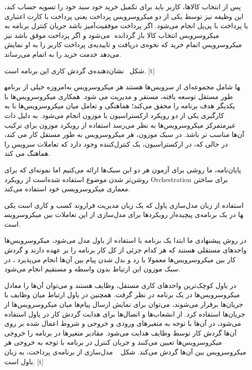 پس از انتخاب کالاها، کاربر باید برای تکمیل خرید خود سبد خود را تسویه حساب کند، این وظیفه نیز توسط یکی از دو میکروسرویس پرداخت یعنی پرداخت با کارت اعتباری یا پرداخت با پی‌پل انجام می‌شود. اگر پرداخت موفقیت‌آمیز باشد جریان کنترل برنامه به میکروسرویس انتخاب کالا باز گردانده ‌ می‌شود و اگر پرداخت موفق باشد نیز میکروسرویس اتمام خرید که نحوه‌ی دریافت و تاییدیه‌ی پرداخت کاربر را به او نمایش می‌دهد خدمت خرید را به اتمام می‌رساند.

شکل~ نشان‌دهنده‌ی گردش کاری این برنامه است.
[t]
\vspace{0.5em}



امروزه خیلی از برنامه‎ها شامل مجموعه‌ای از سرویس‌ها هستند هر میکروسرویس به طور مستقل توسعه یافته، مستقر و مدیریت می شود. 
همکاری میکروسرویس‌ها با یکدیگر هدف برنامه را محقق می‌کند؛ هماهنگی و تعامل میان میکروسرویس‌ها با به کارگیری یکی از دو رویکرد ارکستراسیون یا  موزون انجام می‌شود.
به دلیل ذات غیرمتمرکز میکروسرویس‌ها به نظر می‌رسد استفاده از رویکرد موزون برای ترکیب آن‌ها مناسب تر باشد. 
در سبک موزون، هر میکروسرویس به طور مستقل کار می کند، در حالی که، در ارکستراسیون، یک کنترل‌کننده وجود دارد که تعاملات سرویس را هماهنگ می کند. 

پایان‌نامه، ما روشی برای آزمون هر دو این سبک‌ها ارائه می‌کنیم اما نمونه‌ای که برای روشن‌تر شدن موضوع استفاده شده‌است از رویکرد Orchestration برای ساختن معماری میکروسرویسی خود استفاده می‌کند. 

استفاده از زبان‌ مدل‌سازی یاول که یک زبان مدیریت فراروند کسب و کاری است یکی از رویکردها برای مدل‌سازی از این تعاملات بین میکروسرویس‎ها در یک برنامه‌ی پیچیده است.

در روش پیشنهادی ما ابتدا یک برنامه با استفاده از یاول مدل می‌شود، میکروسرویس‌ها واحد‌های مستقلی هستند که هر کدام جزئی از کل کار برنامه را بر عهده دارند و گردش کار بین میکروسرویس‌ها معمولا با رد و بدل شدن پیام بین آن‌ها انجام می‌پذیرد ،
 در سبک موزون این ارتباط بدون واسطه و مستقیم انجام می‌شود. 
 
 در یاول کوچک‌ترین واحدهای کاری مستقل، وظایف هستند و می‌توان آن‌ها را معادل میکروسرویس‌ها در یک برنامه در نظر گرفت. 
 همچنین در یاول ارتباط میان وظایف با جریان‌ها برقرار می‌شوند،  می‌توان برای نمایش ارسال پیام‌ها میان میکروسرویس‌ها از جریان‌ها استفاده کرد. 
 از انشعاب‌ها و اتصال‌ها برای هدایت گردش کار در یاول استفاده می‌شود، در آن‌ها با توجه به متغیر‌های ورودی و خروجی و شروط اعمال شده بر روی آن‌ها گردش کار توسط وظایف هدایت می‌شود. 
 مقادیر متغیرها در برنامه را خروجی میکروسرویس‌ها تعیین می‌کنند و جریان کنترل در برنامه با توجه به خروجی هر میکروسرویس بین آن‌ها گردش می‌کند. شکل ~ مدل‌سازی از برنامه‌ی پرداخت، به زبان یاول است.
[t]
\vspace{0.5em}

